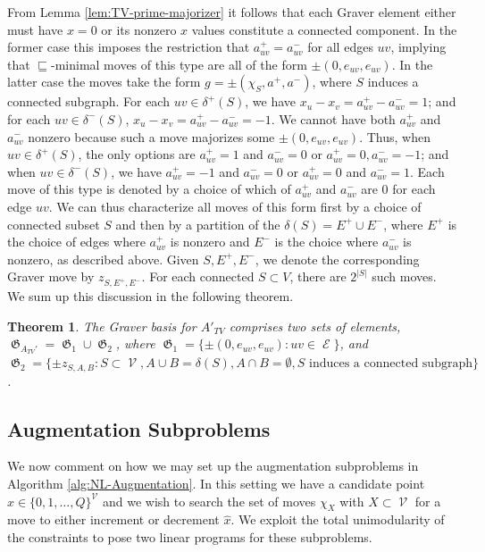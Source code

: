 \documentclass[pdflatex,sn-mathphys-num]{sn-jnl}%
\newtheorem{theorem}{Theorem}
\DeclareMathOperator{\Ecal}{\mathcal{E}}
\DeclareMathOperator{\Vcal}{\mathcal{V}}
\DeclareMathOperator{\Gfrak}{\mathfrak{G}}
\begin{document}
From Lemma \ref{lem:TV-prime-majorizer} it follows that each Graver element either must have $x = 0$ or its nonzero $x$ values constitute a connected component. 
In the former case this imposes the restriction that $a_{uv}^+ = a_{uv}^-$ for all edges $uv$, implying that $\sqsubseteq$-minimal moves of this type are all of the form $\pm(0, e_{uv},e_{uv})$. 
In the latter case the moves take the form $g = \pm(\chi_S, a^+, a^-)$, where $S$ induces a connected subgraph. For each $uv \in \delta^+(S)$, we have $x_u - x_v = a_{uv}^+ - a_{uv}^- = 1$; and for each $uv \in \delta^-(S)$, $x_u - x_v = a_{uv}^+ - a_{uv}^- = -1$. We cannot have both $a_{uv}^+$ and $a_{uv}^-$ nonzero because such a move majorizes some $\pm(0, e_{uv}, e_{uv})$. Thus,  when $uv \in \delta^+(S)$, the only options are $a_{uv}^+ = 1$ and $a_{uv}^- = 0$ or $a_{uv}^+ = 0, a_{uv}^- = -1$; and when $uv \in \delta^-(S)$, we have $a_{uv}^+ = -1$ and $a_{uv}^- = 0$ or $a_{uv}^+ = 0$ and $a_{uv}^- = 1$. Each move of this type is denoted by a choice of which of $a_{uv}^+$ and $a_{uv}^-$ are 0 for each edge $uv$. We can thus characterize all moves of this form  first by a choice of connected subset $S$ and then by a partition of the $\delta(S) = E^+ \cup E^-$, where $E^+$ is the choice of edges where $a_{uv}^+$ is nonzero and $E^-$ is the choice where $a_{uv}^-$ is nonzero, as described above. Given $S, E^+, E^-$, we denote the corresponding Graver move by $z_{S,E^+,E^-}$. 
For each connected $S \subset V$, there are $2^{|S|}$ such moves. 
We sum up this discussion in the following theorem.

\begin{theorem}
    The Graver basis for $A'_{TV}$ comprises two sets of elements, $\Gfrak_{A_{TV}'} = \Gfrak_1 \cup \Gfrak_2$, where $\Gfrak_1 = \{ \pm (0, e_{uv}, e_{uv}) : uv \in \Ecal\}$, and $\Gfrak_2 = \{ \pm z_{S,A,B} : S \subset \Vcal, A \cup B = \delta(S), A \cap B = \emptyset, S \text{ induces a connected subgraph} \}$.
\end{theorem}\label{thm:alt-graver-basis}

\subsection{Augmentation Subproblems}

We now comment on how we may set up the augmentation subproblems in Algorithm \ref{alg:NL-Augmentation}.
In this setting we have a candidate point $\hat{x} \in \{0,1,\ldots,Q\}^{\Vcal}$ and we wish to search  the set of moves $\chi_X$ with $X \subset \Vcal$ for a move to either increment or decrement $\hat{x}$. 
We exploit the total unimodularity of the constraints to pose two linear programs for these subproblems.
\end{document}
